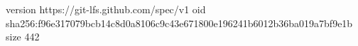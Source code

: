 version https://git-lfs.github.com/spec/v1
oid sha256:f96e317079bcb14c8d0a8106c9c43e671800e196241b6012b36ba019a7bf9e1b
size 442
